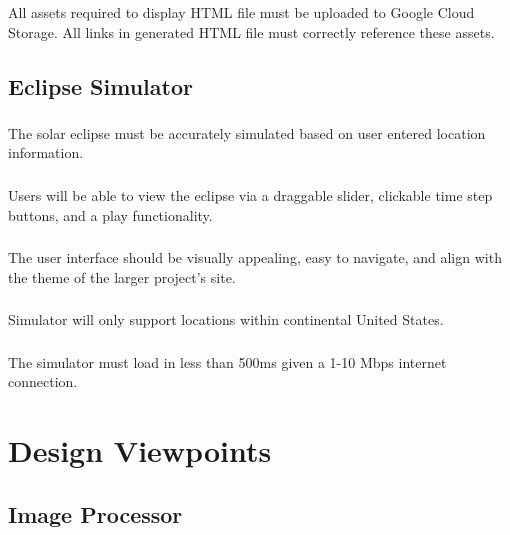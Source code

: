 \documentclass[10pt, onecolumn, draftclsnofoot, letterpaper, compsoc]{IEEEtran}
\begin{document}
	\subsubsection{}
	All assets required to display HTML file must be uploaded to Google Cloud Storage.
	All links in generated HTML file must correctly reference these assets. \\

\subsection{Eclipse Simulator}
    \subsubsection{}
    The solar eclipse must be accurately simulated based on
    user entered location information.

    \subsubsection{}
    Users will be able to view the eclipse via a
    draggable slider, clickable time step buttons, and a play functionality.

    \subsubsection{}
    The user interface should be visually appealing, easy to navigate, and align
    with the theme of the larger project's site.

    \subsubsection{}
    Simulator will only support locations within continental
    United States.

    \subsubsection{}
    The simulator must load in less than 500ms given a 1-10
    Mbps internet connection. \\


\section{Design Viewpoints}

\subsection{Image Processor}
\end{document}
